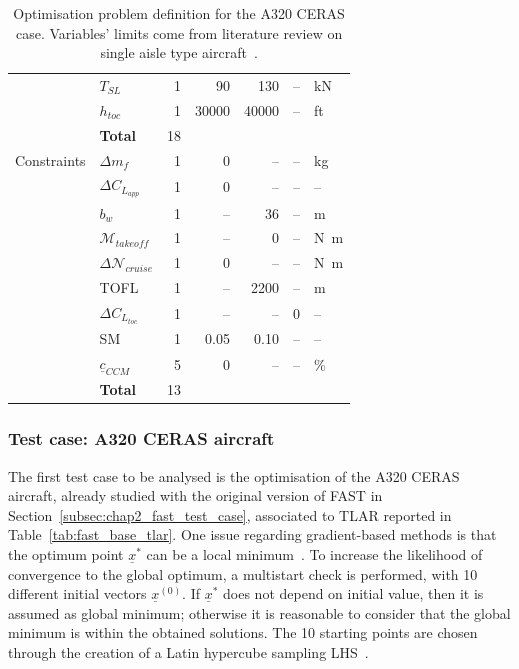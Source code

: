 \begin{table}[h!]
\begin{tabular}{l l r r r r l}
		& $T_{SL}$ & 1 & \num{90} & \num{130} & -- & \si{\kilo\newton} \\
		& $h_{toc}$ & 1 & \num{30000} & \num{40000} & -- & ft \\
		& \textbf{Total} & 18 & & & & \\
		\hline
		Constraints & $\Delta m_{f}$ & 1 & 0 & -- & -- & \si{\kilogram} \\
		& $\Delta C_{L_{app}}$ & 1 & 0 & -- & -- & -- \\
		& $b_w$ & 1 & -- & \num{36} & -- & \si{\meter} \\
		& $\mathcal{M}_{takeoff}$ & 1 & -- & \num{0} & -- & \si{\newton\meter}  \\
		& $\Delta \mathcal{N}_{cruise}$ & 1 & \num{0} & -- & -- & \si{\newton\meter} \\
		& TOFL & 1 & -- & \num{2200} & -- & \si{\meter} \\
		& $\Delta C_{L_{toc}}$ & 1 & -- & -- & 0 & -- \\
		& SM & 1 & \num{0.05} & \num{0.10} & -- & -- \\
		& $\underline{c}_{CCM}$ & 5 & \num{0} & -- & -- & \% \\
		& \textbf{Total} & 13 & & & & \\
		\hline    	
	\end{tabular} 
	\caption{Optimisation problem definition for the A320 CERAS case. Variables' limits come from literature review on single aisle type aircraft~\cite{bib:roskam_partII}.}
	\label{tab:a320_base_problem_optimisation_definition}
\end{table}

\subsubsection{Test case: A320 CERAS aircraft}
\label{subsubsec:chap2_a320_optim_ceras}

The first test case to be analysed is the optimisation of the A320 CERAS aircraft, already studied with the original version of FAST in Section~\ref{subsec:chap2_fast_test_case}, associated to TLAR reported in Table~\ref{tab:fast_base_tlar}. 
One issue regarding gradient-based methods is that the optimum point $\underline{x}^*$ can be a local minimum~\cite{bib:martins_mdo}.
To increase the likelihood of convergence to the global optimum, a multistart check is performed, with 10 different initial vectors $\underline{x}^{(0)}$.
If $\underline{x}^*$ does not depend on initial value, then it is assumed as global minimum; otherwise it is reasonable to consider that the global minimum is within the obtained solutions.
The 10 starting points are chosen through the creation of a Latin hypercube sampling LHS~\cite{bib:sacks}. 

